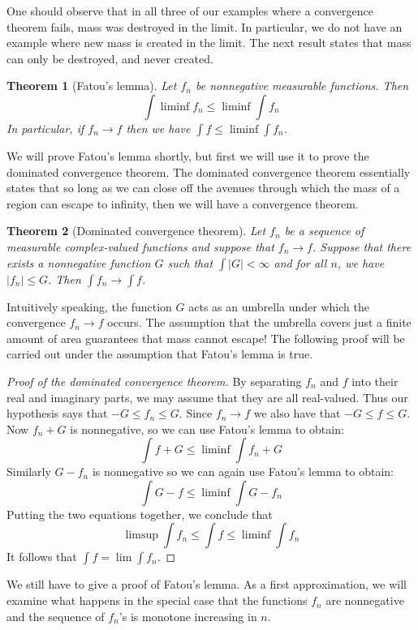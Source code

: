\documentclass[11pt,oneside]{amsbook}
\theoremstyle{definition}
\theoremstyle{plain}
\newtheorem{thm}{Theorem}[section]
\theoremstyle{definition}
\theoremstyle{remark}
\numberwithin{equation}{section}
\numberwithin{figure}{section}
\begin{document}
One should observe that in all three of our examples where a convergence theorem fails, mass was destroyed in the limit. In particular, we do not have an example where new mass is created in the limit. The next result states that mass can only be destroyed, and never created.

\begin{thm}[Fatou's lemma]
  Let $f_n$ be nonnegative measurable functions. Then
  \[\int\liminf f_n\leq\liminf\int f_n
  \]
  In particular, if $f_n\to f$ then we have $\int f\leq\liminf\int f_n$.
\end{thm}

We will prove Fatou's lemma shortly, but first we will use it to prove the dominated convergence theorem. The dominated convergence theorem essentially states that so long as we can close off the avenues through which the mass of a region can escape to infinity, then we will have a convergence theorem.

\begin{thm}[Dominated convergence theorem]
  Let $f_n$ be a sequence of measurable complex-valued functions and suppose that $f_n\to f$. Suppose that there exists a nonnegative function $G$ such that $\int|G|<\infty$ and for all $n$, we have $|f_n|\leq G$. Then $\int f_n\to \int f$.
\end{thm}

Intuitively speaking, the function $G$ acts as an umbrella under which the convergence $f_n\to f$ occurs. The assumption that the umbrella covers just a finite amount of area guarantees that mass cannot escape! The following proof will be carried out under the assumption that Fatou's lemma is true.

\begin{proof}[Proof of the dominated convergence theorem]
  By separating $f_n$ and $f$ into their real and imaginary parts, we may assume that they are all real-valued. Thus our hypothesis says that $-G\leq f_n\leq G$. Since $f_n\to f$ we also have that $-G\leq f\leq G$. Now $f_n+G$ is nonnegative, so we can use Fatou's lemma to obtain:
  \[\int f+G\leq\liminf\int f_n+G
  \]
  Similarly $G-f_n$ is nonnegative so we can again use Fatou's lemma to obtain:
  \[\int G-f\leq\liminf\int G-f_n
  \]
  Putting the two equations together, we conclude that
  \[\limsup\int f_n\leq\int f\leq\liminf\int f_n
  \]
  It follows that $\int f=\lim\int f_n$.
\end{proof}

We still have to give a proof of Fatou's lemma. As a first approximation, we will examine what happens in the special case that the functions $f_n$ are nonnegative and the sequence of $f_n$'s is monotone increasing in $n$.
\end{document}
